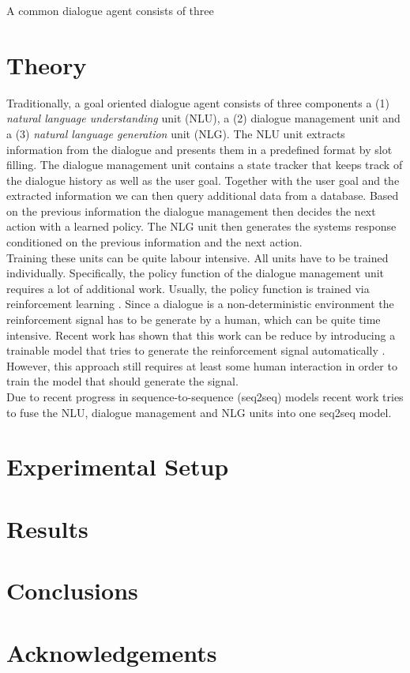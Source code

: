 \documentclass[twocolumn]{tum-article}
\begin{document}
A common dialogue agent consists of three 
\section{Theory}

Traditionally, a goal oriented dialogue agent consists of three components a (1) \textit{natural language understanding} unit (NLU), a (2) dialogue management unit and a (3) \textit{natural language generation} unit (NLG). The NLU unit extracts information from the dialogue and presents them in a predefined format by slot filling. The dialogue management unit contains a state tracker that keeps track of the dialogue history as well as the user goal. Together with the user goal and the extracted information we can then query additional data from a database. Based on the previous information the dialogue management then decides the next action with a learned policy. The NLG unit then generates the systems response conditioned on the previous information and the next action.\\
Training these units can be quite labour intensive. All units have to be trained individually. Specifically, the policy function of the dialogue management unit requires a lot of additional work. Usually, the policy function is trained via reinforcement learning \cite{DBLP:journals/ml/Williams92}. Since a dialogue is a non-deterministic environment the reinforcement signal has to be generate by a human, which can be quite time intensive. Recent work has shown that this work can be reduce by introducing a trainable model that tries to generate the reinforcement signal automatically \cite{DBLP:journals/corr/abs-1907-00448}. However, this approach still requires at least some human interaction in order to train the model that should generate the signal.\\
Due to recent progress in sequence-to-sequence (seq2seq) models \cite{radford2019language, raffel2019exploring} recent work tries to fuse the NLU, dialogue management and NLG units into one seq2seq model. 
\section{Experimental Setup}

\lipsum[4-5]

\section{Results}

\lipsum[6]

\section{Conclusions}

\lipsum[7]

\section*{Acknowledgements}

\lipsum[8]



\end{document}
